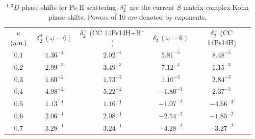 \documentclass[preprint,showpacs,showkeys,preprintnumbers,amsmath,amssymb,longbibliography,pra,aps]{revtex4-1}
\begin{document}
\begin{table}
\begin{center}
\begin{ruledtabular}
\begin{tabular}{c c c c c}
$\kappa$ (a.u.) & $\delta_2^+ (\omega = 6)$ & $\delta_2^+$ (CC 14Ps14H+H$^-$) \cite{Walters2004} & $\delta_2^- (\omega = 6)$ & $\delta_2^-$ (CC 14Ps14H) \cite{Blackwood2002} \\
\colrule
$0.1$ & $1.36^{-4}$ & $2.02^{-4}$ & $5.81^{-5}$ & $8.48^{-5}$ \\
$0.2$ & $2.99^{-3}$ & $3.49^{-3}$ & $7.12^{-4}$ & $1.15^{-3}$ \\
$0.3$ & $1.60^{-2}$ & $1.73^{-2}$ & $1.10^{-3}$ & $2.84^{-3}$ \\
$0.4$ & $4.98^{-2}$ & $5.22^{-2}$ & $-1.80^{-3}$ & $2.37^{-3}$ \\
$0.5$ & $1.13^{-1}$ & $1.16^{-1}$ & $-1.07^{-2}$ & $-4.66^{-3}$ \\
$0.6$ & $2.06^{-1}$ & $2.08^{-1}$ & $-2.54^{-2}$ & $-1.85^{-2}$ \\
$0.7$ & $3.28^{-1}$ & $3.24^{-1}$ & $-4.28^{-2}$ & $-3.27^{-2}$ \\
\end{tabular}
\end{ruledtabular}
\caption{$^{1,3}D$ phase shifts for Ps-H scattering. $\delta_2^\pm$ are the current
$S$ matrix complex Kohn phase shifts. Powers of 10 are denoted by exponents.}
\label{tab:DWavePhase}
\end{center}
\end{table}
\end{document}
